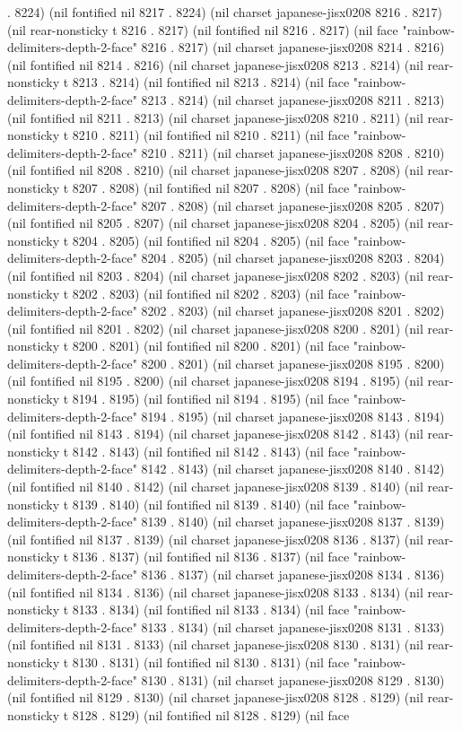 . 8224) (nil fontified nil 8217 . 8224) (nil charset japanese-jisx0208 8216 . 8217) (nil rear-nonsticky t 8216 . 8217) (nil fontified nil 8216 . 8217) (nil face "rainbow-delimiters-depth-2-face" 8216 . 8217) (nil charset japanese-jisx0208 8214 . 8216) (nil fontified nil 8214 . 8216) (nil charset japanese-jisx0208 8213 . 8214) (nil rear-nonsticky t 8213 . 8214) (nil fontified nil 8213 . 8214) (nil face "rainbow-delimiters-depth-2-face" 8213 . 8214) (nil charset japanese-jisx0208 8211 . 8213) (nil fontified nil 8211 . 8213) (nil charset japanese-jisx0208 8210 . 8211) (nil rear-nonsticky t 8210 . 8211) (nil fontified nil 8210 . 8211) (nil face "rainbow-delimiters-depth-2-face" 8210 . 8211) (nil charset japanese-jisx0208 8208 . 8210) (nil fontified nil 8208 . 8210) (nil charset japanese-jisx0208 8207 . 8208) (nil rear-nonsticky t 8207 . 8208) (nil fontified nil 8207 . 8208) (nil face "rainbow-delimiters-depth-2-face" 8207 . 8208) (nil charset japanese-jisx0208 8205 . 8207) (nil fontified nil 8205 . 8207) (nil charset japanese-jisx0208 8204 . 8205) (nil rear-nonsticky t 8204 . 8205) (nil fontified nil 8204 . 8205) (nil face "rainbow-delimiters-depth-2-face" 8204 . 8205) (nil charset japanese-jisx0208 8203 . 8204) (nil fontified nil 8203 . 8204) (nil charset japanese-jisx0208 8202 . 8203) (nil rear-nonsticky t 8202 . 8203) (nil fontified nil 8202 . 8203) (nil face "rainbow-delimiters-depth-2-face" 8202 . 8203) (nil charset japanese-jisx0208 8201 . 8202) (nil fontified nil 8201 . 8202) (nil charset japanese-jisx0208 8200 . 8201) (nil rear-nonsticky t 8200 . 8201) (nil fontified nil 8200 . 8201) (nil face "rainbow-delimiters-depth-2-face" 8200 . 8201) (nil charset japanese-jisx0208 8195 . 8200) (nil fontified nil 8195 . 8200) (nil charset japanese-jisx0208 8194 . 8195) (nil rear-nonsticky t 8194 . 8195) (nil fontified nil 8194 . 8195) (nil face "rainbow-delimiters-depth-2-face" 8194 . 8195) (nil charset japanese-jisx0208 8143 . 8194) (nil fontified nil 8143 . 8194) (nil charset japanese-jisx0208 8142 . 8143) (nil rear-nonsticky t 8142 . 8143) (nil fontified nil 8142 . 8143) (nil face "rainbow-delimiters-depth-2-face" 8142 . 8143) (nil charset japanese-jisx0208 8140 . 8142) (nil fontified nil 8140 . 8142) (nil charset japanese-jisx0208 8139 . 8140) (nil rear-nonsticky t 8139 . 8140) (nil fontified nil 8139 . 8140) (nil face "rainbow-delimiters-depth-2-face" 8139 . 8140) (nil charset japanese-jisx0208 8137 . 8139) (nil fontified nil 8137 . 8139) (nil charset japanese-jisx0208 8136 . 8137) (nil rear-nonsticky t 8136 . 8137) (nil fontified nil 8136 . 8137) (nil face "rainbow-delimiters-depth-2-face" 8136 . 8137) (nil charset japanese-jisx0208 8134 . 8136) (nil fontified nil 8134 . 8136) (nil charset japanese-jisx0208 8133 . 8134) (nil rear-nonsticky t 8133 . 8134) (nil fontified nil 8133 . 8134) (nil face "rainbow-delimiters-depth-2-face" 8133 . 8134) (nil charset japanese-jisx0208 8131 . 8133) (nil fontified nil 8131 . 8133) (nil charset japanese-jisx0208 8130 . 8131) (nil rear-nonsticky t 8130 . 8131) (nil fontified nil 8130 . 8131) (nil face "rainbow-delimiters-depth-2-face" 8130 . 8131) (nil charset japanese-jisx0208 8129 . 8130) (nil fontified nil 8129 . 8130) (nil charset japanese-jisx0208 8128 . 8129) (nil rear-nonsticky t 8128 . 8129) (nil fontified nil 8128 . 8129) (nil face 